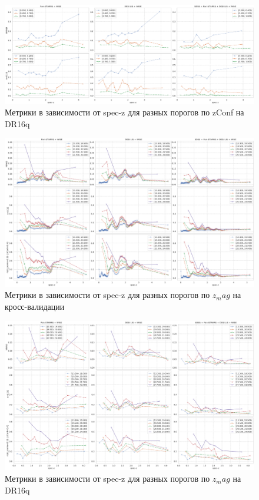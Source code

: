 \documentclass[fleqn,usenatbib]{mnras}
\begin{document}
\begin{landscape}
\begin{figure}
    \centering
    \includegraphics[width=0.9\linewidth]{images/metrics-adv-zspec-x-zconf-dr16q.png}
    \caption{Метрики в зависимости от spec-z для разных порогов по zConf на DR16q}
    \label{fig:my_label}
\end{figure}
\end{landscape}


\begin{landscape}
\begin{figure}
    \centering
    \includegraphics[width=0.9\linewidth]{images/metrics-adv-zspec-x-zmag-cv2.png}
    \caption{Метрики в зависимости от spec-z для разных порогов по $z_mag$ на кросс-валидации}
    \label{fig:my_label}
\end{figure}
\end{landscape}


\begin{landscape}
\begin{figure}
    \centering
    \includegraphics[width=0.9\linewidth]{images/metrics-adv-zspec-x-zmag-dr16q.png}
    \caption{Метрики в зависимости от spec-z для разных порогов по $z_mag$ на DR16q}
    \label{fig:my_label}
\end{figure}
\end{landscape}
\end{document}
